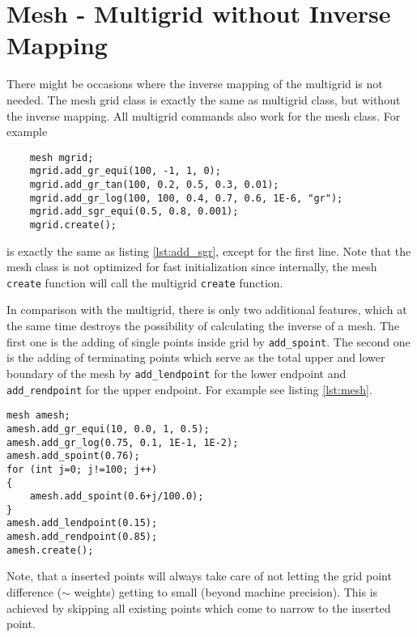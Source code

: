 \chapter{Mesh - Multigrid without Inverse Mapping}
There might be occasions where the inverse mapping of the multigrid is not needed. The mesh grid class is exactly the same as multigrid class, but without the inverse mapping. All multigrid commands also work for the mesh class. For example 
\begin{lstlisting}
	mesh mgrid;
	mgrid.add_gr_equi(100, -1, 1, 0);
	mgrid.add_gr_tan(100, 0.2, 0.5, 0.3, 0.01);
	mgrid.add_gr_log(100, 100, 0.4, 0.7, 0.6, 1E-6, "gr");
	mgrid.add_sgr_equi(0.5, 0.8, 0.001);
	mgrid.create();
\end{lstlisting}
is exactly the same as listing \ref{lst:add_sgr}, except for the first line. Note that the mesh class is not optimized for fast initialization since internally, the mesh \texttt{create} function will call the multigrid \texttt{create} function.

In comparison with the multigrid, there is only two additional features, which at the same time destroys the possibility of calculating the inverse of a mesh. The first one is the adding of single points inside grid by
\texttt{add\_spoint}. The second one is the adding of terminating points which serve as the total upper and lower boundary of the mesh by \texttt{add\_lendpoint} for the lower endpoint and \texttt{add\_rendpoint} for the upper endpoint. For example see listing \ref{lst:mesh}.
\begin{lstlisting}[caption={Example of a mesh},label={lst:mesh}]
mesh amesh;
amesh.add_gr_equi(10, 0.0, 1, 0.5);
amesh.add_gr_log(0.75, 0.1, 1E-1, 1E-2);
amesh.add_spoint(0.76);
for (int j=0; j!=100; j++)
{
	amesh.add_spoint(0.6+j/100.0);
}
amesh.add_lendpoint(0.15);
amesh.add_rendpoint(0.85);
amesh.create();
\end{lstlisting}
Note, that a inserted points will always take care of not letting the grid point difference ($\sim$ weights) getting to small (beyond machine precision). This is achieved by skipping all existing points which come to narrow to the inserted point.